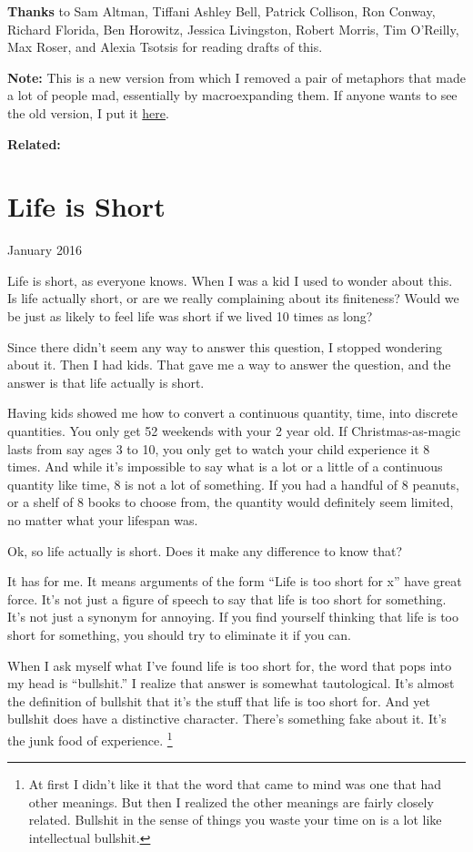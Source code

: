 \documentclass[12pt]{book}
\begin{document}
\textbf{Thanks} to Sam Altman, Tiffani Ashley Bell, Patrick Collison,
Ron Conway, Richard Florida, Ben Horowitz, Jessica Livingston, Robert
Morris, Tim O'Reilly, Max Roser, and Alexia Tsotsis for reading drafts
of this.

\textbf{Note:} This is a new version from which I removed a pair of
metaphors that made a lot of people mad, essentially by macroexpanding
them. If anyone wants to see the old version, I put it
\href{ineqold.html}{here}.

\textbf{Related:}
\chapter{Life is Short}

January 2016

Life is short, as everyone knows. When I was a kid I used to wonder
about this. Is life actually short, or are we really complaining about
its finiteness? Would we be just as likely to feel life was short if we
lived 10 times as long?

Since there didn't seem any way to answer this question, I stopped
wondering about it. Then I had kids. That gave me a way to answer the
question, and the answer is that life actually is short.

Having kids showed me how to convert a continuous quantity, time, into
discrete quantities. You only get 52 weekends with your 2 year old. If
Christmas-as-magic lasts from say ages 3 to 10, you only get to watch
your child experience it 8 times. And while it's impossible to say what
is a lot or a little of a continuous quantity like time, 8 is not a lot
of something. If you had a handful of 8 peanuts, or a shelf of 8 books
to choose from, the quantity would definitely seem limited, no matter
what your lifespan was.

Ok, so life actually is short. Does it make any difference to know that?

It has for me. It means arguments of the form ``Life is too short for
x'' have great force. It's not just a figure of speech to say that life
is too short for something. It's not just a synonym for annoying. If you
find yourself thinking that life is too short for something, you should
try to eliminate it if you can.

When I ask myself what I've found life is too short for, the word that
pops into my head is ``bullshit.'' I realize that answer is somewhat
tautological. It's almost the definition of bullshit that it's the stuff
that life is too short for. And yet bullshit does have a distinctive
character. There's something fake about it. It's the junk food of
experience. \footnote{At first I didn't like it that the word that came to mind was
one that had other meanings. But then I realized the other meanings are
fairly closely related. Bullshit in the sense of things you waste your
time on is a lot like intellectual bullshit.}
\end{document}
